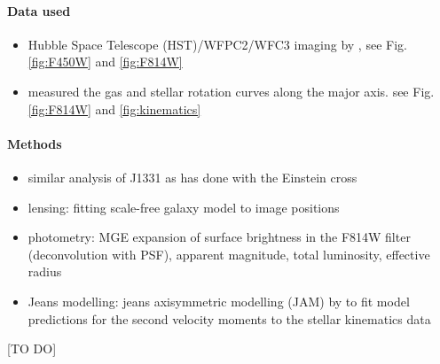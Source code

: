 \paragraph{Data used}
\begin{itemize}
\item Hubble Space Telescope (HST)/WFPC2/WFC3 imaging by \cite{SWELLSI}, see Fig. \ref{fig:F450W} and \ref{fig:F814W}
\item  \citet{SWELLSV} measured the gas and stellar rotation curves along the major axis. see Fig. \ref{fig:F814W} and \ref{fig:kinematics}
\end{itemize}

\paragraph{Methods}
\begin{itemize}
\item similar analysis of J1331 as \citet{GlennEC} has done with the Einstein cross
\item lensing: fitting scale-free galaxy model to image positions \citep{EvansWitt}
\item photometry: MGE expansion of surface brightness in the F814W filter (deconvolution with PSF), apparent magnitude, total luminosity, effective radius
\item Jeans modelling: jeans axisymmetric modelling (JAM) by \citet{Cap08} to fit model predictions for the second velocity moments to the stellar kinematics data
\end{itemize}

[TO DO]




